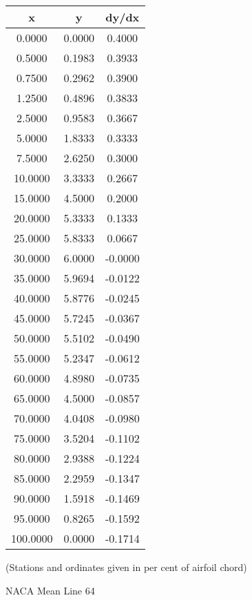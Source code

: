 \documentclass[11pt]{book}
\begin{document}
 \vspace{8mm}
 \begin{tabular}{|c|c|c|}  \hline
 x & y & dy/dx \\
 \hline
0.0000 & 0.0000 & 0.4000 \\
0.5000 & 0.1983 & 0.3933 \\
0.7500 & 0.2962 & 0.3900 \\
1.2500 & 0.4896 & 0.3833 \\
2.5000 & 0.9583 & 0.3667 \\
5.0000 & 1.8333 & 0.3333 \\
7.5000 & 2.6250 & 0.3000 \\
10.0000 & 3.3333 & 0.2667 \\
15.0000 & 4.5000 & 0.2000 \\
20.0000 & 5.3333 & 0.1333 \\
25.0000 & 5.8333 & 0.0667 \\
30.0000 & 6.0000 & -0.0000 \\
35.0000 & 5.9694 & -0.0122 \\
40.0000 & 5.8776 & -0.0245 \\
45.0000 & 5.7245 & -0.0367 \\
50.0000 & 5.5102 & -0.0490 \\
55.0000 & 5.2347 & -0.0612 \\
60.0000 & 4.8980 & -0.0735 \\
65.0000 & 4.5000 & -0.0857 \\
70.0000 & 4.0408 & -0.0980 \\
75.0000 & 3.5204 & -0.1102 \\
80.0000 & 2.9388 & -0.1224 \\
85.0000 & 2.2959 & -0.1347 \\
90.0000 & 1.5918 & -0.1469 \\
95.0000 & 0.8265 & -0.1592 \\
100.0000 & 0.0000 & -0.1714 \\
 \hline
 \end{tabular}
 \vspace{8mm}

(Stations and ordinates given in per cent of airfoil chord)

 \newpage
 \label{ml64}
 \begin{Large}
 NACA Mean Line 64
 \end{Large}
  
\end{document}
